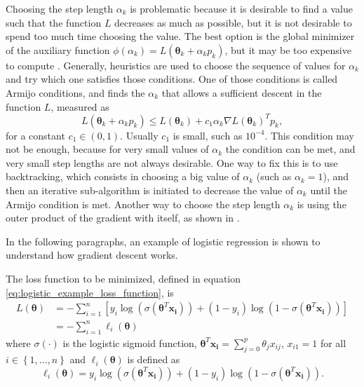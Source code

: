 Choosing the step length $\alpha_k$ is problematic because it is desirable to find a value such that the function $L$ decreases as much as possible, but it is not desirable to spend too much time choosing the value. The best option is the global minimizer of the auxiliary function $\phi(\alpha_k) = L(\boldsymbol{\theta}_k + \alpha_k p_k)$, but it may be too expensive to compute \cite[p.~31]{nocedal2006numerical}. Generally, heuristics are used to choose the sequence of values for $\alpha_k$ and try which one satisfies those conditions. One of those conditions is called Armijo conditions, and finds the $\alpha_k$ that allows a sufficient descent in the function $L$, measured as
\begin{equation}
    L(\boldsymbol{\theta}_k + \alpha_k p_k) \leq L(\boldsymbol{\theta}_k) + c_1 \alpha_k \nabla L(\boldsymbol{\theta}_k)^T p_k,
\end{equation}
for a constant $c_1 \in (0, 1)$. Usually $c_1$ is small, such as $10^{-4}$. This condition may not be enough, because for very small values of $\alpha_k$ the condition can be met, and very small step lengths are not always desirable. One way to fix this is to use backtracking, which consists in choosing a big value of $\alpha_k$ (such as $\alpha_k = 1$), and then an iterative sub-algorithm is initiated to decrease the value of $\alpha_k$ until the Armijo condition is met. Another way to choose the step length $\alpha_k$ is using the outer product of the gradient with itself, as shown in \cite{duchi2011adaptive}.

In the following paragraphs, an example of logistic regression is shown to understand how gradient descent works.

The loss function to be minimized, defined in equation \eqref{eq:logistic_example_loss_function}, is
\begin{equation}
  \begin{split}
    L(\boldsymbol{\theta}) & = - \sum_{i=1}^{n} \left[ y_i \log(\sigma(\boldsymbol{\theta}^T \boldsymbol{x_i})) + (1-y_i) \log(1-\sigma(\boldsymbol{\theta}^T \boldsymbol{x_i})) \right] \\
    & = - \sum_{i=1}^{n}{\ell_i(\boldsymbol{\theta})}
  \end{split}
\end{equation}
where $\sigma(\cdot)$ is the logistic sigmoid function, $\boldsymbol{\theta}^T \boldsymbol{x_i} = \sum_{j=0}^{p}{\theta_j x_{ij}}$, $x_{i1} = 1$ for all $i \in \left\{1, ..., n \right\}$ and $\ell_i(\boldsymbol{\theta})$ is defined as
\begin{equation}
  \ell_i(\boldsymbol{\theta}) = y_i \log(\sigma(\boldsymbol{\theta}^T \boldsymbol{x_i})) + (1-y_i) \log(1-\sigma(\boldsymbol{\theta}^T \boldsymbol{x_i})).
\end{equation}

